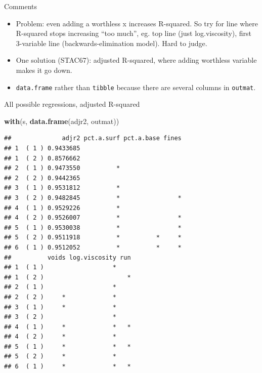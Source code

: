 \documentclass[ignorenonframetext,]{beamer}
\newenvironment{Shaded}{\begin{snugshade}}{\end{snugshade}}
\newcommand{\KeywordTok}[1]{\textcolor[rgb]{0.13,0.29,0.53}{\textbf{#1}}}
\newcommand{\NormalTok}[1]{#1}
\providecommand{\tightlist}{%
  \setlength{\itemsep}{0pt}\setlength{\parskip}{0pt}}
\begin{document}
\begin{frame}[fragile]{Comments}
\protect\hypertarget{comments-19}{}

\begin{itemize}
\tightlist
\item
  Problem: even adding a worthless x increases R-squared. So try for
  line where R-squared stops increasing ``too much'', eg. top line (just
  log.viscosity), first 3-variable line (backwards-elimination model).
  Hard to judge.
\item
  One solution (STAC67): adjusted R-squared, where adding worthless
  variable makes it go down.
\item
  \texttt{data.frame} rather than \texttt{tibble} because there are
  several columns in \texttt{outmat}.
\end{itemize}

\end{frame}

\begin{frame}[fragile]{All possible regressions, adjusted R-squared}
\protect\hypertarget{all-possible-regressions-adjusted-r-squared}{}

\begin{Shaded}
\begin{Highlighting}[]
\KeywordTok{with}\NormalTok{(s, }\KeywordTok{data.frame}\NormalTok{(adjr2, outmat))}
\end{Highlighting}
\end{Shaded}

\begin{verbatim}
##              adjr2 pct.a.surf pct.a.base fines
## 1  ( 1 ) 0.9433685                            
## 1  ( 2 ) 0.8576662                            
## 2  ( 1 ) 0.9473550          *                 
## 2  ( 2 ) 0.9442365                            
## 3  ( 1 ) 0.9531812          *                 
## 3  ( 2 ) 0.9482845          *                *
## 4  ( 1 ) 0.9529226          *                 
## 4  ( 2 ) 0.9526007          *                *
## 5  ( 1 ) 0.9530038          *                *
## 5  ( 2 ) 0.9511918          *          *     *
## 6  ( 1 ) 0.9512052          *          *     *
##          voids log.viscosity run
## 1  ( 1 )                   *    
## 1  ( 2 )                       *
## 2  ( 1 )                   *    
## 2  ( 2 )     *             *    
## 3  ( 1 )     *             *    
## 3  ( 2 )                   *    
## 4  ( 1 )     *             *   *
## 4  ( 2 )     *             *    
## 5  ( 1 )     *             *   *
## 5  ( 2 )     *             *    
## 6  ( 1 )     *             *   *
\end{verbatim}

\end{frame}
\end{document}
